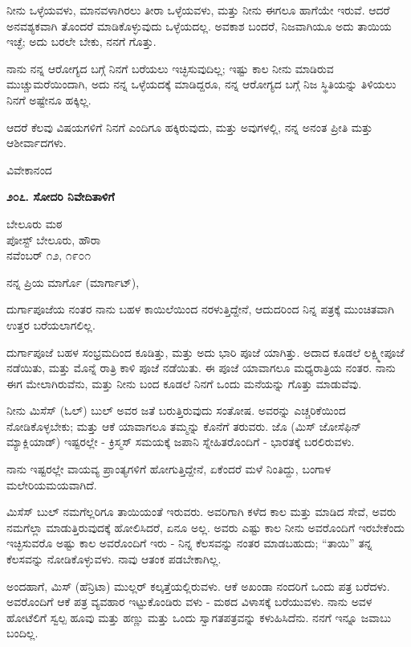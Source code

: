 ನೀನು ಒಳ್ಳೆಯವಳು, ಮಾನವಳಾಗಿರಲು ತೀರಾ ಒಳ್ಳೆಯವಳು, ಮತ್ತು ನೀನು ಈಗಲೂ ಹಾಗೆಯೇ ಇರುವೆ. ಆದರೆ ಅನವಶ್ಯಕವಾಗಿ ತೊಂದರೆ ಮಾಡಿಕೊಳ್ಳುವುದು ಒಳ್ಳೆಯದಲ್ಲ. ಅವಕಾಶ ಬಂದರೆ, ನಿಜವಾಗಿಯೂ ಅದು ತಾಯಿಯ ಇಚ್ಛೆ; ಅದು ಬರಲೇ ಬೇಕು, ನನಗೆ ಗೊತ್ತು.

ನಾನು ನನ್ನ ಆರೋಗ್ಯದ ಬಗ್ಗೆ ನಿನಗೆ ಬರೆಯಲು ಇಚ್ಛಿಸುವುದಿಲ್ಲ; ಇಷ್ಟು ಕಾಲ ನೀನು ಮಾಡಿರುವ ಮುಚ್ಚುಮರೆಯಿಂದಾಗಿ, ಅದು ನನ್ನ ಒಳ್ಳೆಯದಕ್ಕೆ ಮಾಡಿದ್ದರೂ, ನನ್ನ ಆರೋಗ್ಯದ ಬಗ್ಗೆ ನಿಜ ಸ್ಥಿತಿಯನ್ನು ತಿಳಿಯಲು ನಿನಗೆ ಅಷ್ಟೇನೂ ಹಕ್ಕಿಲ್ಲ.

ಆದರೆ ಕೆಲವು ವಿಷಯಗಳಿಗೆ ನಿನಗೆ ಎಂದಿಗೂ ಹಕ್ಕಿರುವುದು, ಮತ್ತು ಅವುಗಳಲ್ಲಿ, ನನ್ನ ಅನಂತ ಪ್ರೀತಿ ಮತ್ತು ಆಶೀರ್ವಾದಗಳು.

\begin{flushright}
ವಿವೇಕಾನಂದ
\end{flushright}

\begin{center}
\textbf{೨೦೭. ಸೋದರಿ ನಿವೇದಿತಾಳಿಗೆ}
\end{center}

\begin{flushright}
ಬೇಲೂರು ಮಠ\\ಪೋಸ್ಟ್ ಬೇಲೂರು, ಹೌರಾ\\ನವೆಂಬರ್ ೧೨, ೧೯೦೧
\end{flushright}

ನನ್ನ ಪ್ರಿಯ ಮಾರ್ಗೊ (ಮಾರ್ಗಾಟ್),

ದುರ್ಗಾಪೂಜೆಯ ನಂತರ ನಾನು ಬಹಳ ಕಾಯಿಲೆಯಿಂದ ನರಳುತ್ತಿದ್ದೇನೆ, ಆದುದರಿಂದ ನಿನ್ನ ಪತ್ರಕ್ಕೆ ಮುಂಚಿತವಾಗಿ ಉತ್ತರ ಬರೆಯಲಾಗಲಿಲ್ಲ.

ದುರ್ಗಾಪೂಜೆ ಬಹಳ ಸಂಭ್ರಮದಿಂದ ಕೂಡಿತ್ತು, ಮತ್ತು ಅದು ಭಾರಿ ಪೂಜೆ ಯಾಗಿತ್ತು. ಅದಾದ ಕೂಡಲೆ ಲಕ್ಷ್ಮೀಪೂಜೆ ನಡೆಯಿತು, ಮತ್ತು ಮೊನ್ನೆ ರಾತ್ರಿ ಕಾಳಿ ಪೂಜೆ ನಡೆಯಿತು. ಈ ಪೂಜೆ ಯಾವಾಗಲೂ ಮಧ್ಯರಾತ್ರಿಯ ನಂತರ. ನಾನು ಈಗ ಮೇಲಾಗಿರುವೆನು, ಮತ್ತು ನೀನು ಬಂದ ಕೂಡಲೆ ನಿನಗೆ ಒಂದು ಮನೆಯನ್ನು ಗೊತ್ತು ಮಾಡುವೆವು.

ನೀನು ಮಿಸೆಸ್ (ಓಲ್) ಬುಲ್ ಅವರ ಜತೆ ಬರುತ್ತಿರುವುದು ಸಂತೋಷ. ಅವರನ್ನು ಎಚ್ಚರಿಕೆಯಿಂದ ನೋಡಿಕೊಳ್ಳಬೇಕು; ಮತ್ತು ಆಕೆ ಯಾವಾಗಲೂ ತಮ್ಮನ್ನು ಕೊನೆಗೆ ತರುವರು. ಜೊ (ಮಿಸ್ ಜೋಸೆಫಿನ್ ಮ್ಯಾಕ್ಲಿಯಾಡ್) ಇಷ್ಟರಲ್ಲೇ - ಕ್ರಿಸ್ಮಸ್ ಸಮಯಕ್ಕೆ ಜಪಾನಿ ಸ್ನೇಹಿತರೊಂದಿಗೆ - ಭಾರತಕ್ಕೆ ಬರಲಿರುವಳು.

ನಾನು ಇಷ್ಟರಲ್ಲೇ ವಾಯವ್ಯ ಪ್ರಾಂತ್ಯಗಳಿಗೆ ಹೋಗುತ್ತಿದ್ದೇನೆ, ಏಕೆಂದರೆ ಮಳೆ ನಿಂತಿದ್ದು, ಬಂಗಾಳ ಮಲೇರಿಯಮಯವಾಗಿದೆ.

ಮಿಸೆಸ್ ಬುಲ್ ನಮಗೆಲ್ಲರಿಗೂ ತಾಯಿಯಂತೆ ಇರುವರು. ಅವರಿಗಾಗಿ ಕಳೆದ ಕಾಲ ಮತ್ತು ಮಾಡಿದ ಸೇವೆ, ಅವರು ನಮಗೆಲ್ಲಾ ಮಾಡುತ್ತಿರುವುದಕ್ಕೆ ಹೋಲಿಸಿದರೆ, ಏನೂ ಅಲ್ಲ. ಅವರು ಎಷ್ಟು ಕಾಲ ನೀನು ಅವರೊಂದಿಗೆ ಇರಬೇಕೆಂದು ಇಚ್ಛಿಸುವರೊ ಅಷ್ಟು ಕಾಲ ಅವರೊಂದಿಗೆ ಇರು - ನಿನ್ನ ಕೆಲಸವನ್ನು ನಂತರ ಮಾಡಬಹುದು; “ತಾಯಿ” ತನ್ನ ಕೆಲಸವನ್ನು ನೋಡಿಕೊಳ್ಳುವಳು. ನಾವು ಆತಂಕ ಪಡಬೇಕಾಗಿಲ್ಲ.

ಅಂದಹಾಗೆ, ಮಿಸ್ (ಹೆನ್ರಿಟಾ) ಮುಲ್ಲರ್ ಕಲ್ಕತ್ತೆಯಲ್ಲಿರುವಳು. ಆಕೆ ಅಖಂಡಾ ನಂದರಿಗೆ ಒಂದು ಪತ್ರ ಬರೆದಳು. ಅವರೊಂದಿಗೆ ಆಕೆ ಪತ್ರ ವ್ಯವಹಾರ ಇಟ್ಟುಕೊಂಡಿರು ವಳು - ಮಠದ ವಿಳಾಸಕ್ಕೆ ಬರೆಯುವಳು. ನಾನು ಅವಳ ಹೋಟೆಲಿಗೆ ಸ್ವಲ್ಪ ಹೂವು ಮತ್ತು ಹಣ್ಣು ಮತ್ತು ಒಂದು ಸ್ವಾಗತಪತ್ರವನ್ನು ಕಳುಹಿಸಿದೆನು. ನನಗೆ ಇನ್ನೂ ಜವಾಬು ಬಂದಿಲ್ಲ.

